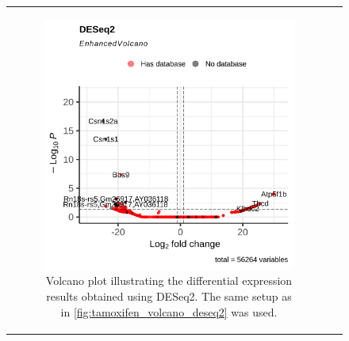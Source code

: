 \begin{figure}[H] \begin{tabular}{cc} \begin{subfigure}{0.5\textwidth}
                 \centering

                 \includegraphics[width=\linewidth]{chapters/4_results_and_discussion/figures/dea/deseq2/letrozole/volcano.png}
                 \caption{Volcano plot illustrating the differential expression
                     results obtained
                     using DESeq2.
                     The same setup as in \cref{fig:tamoxifen_volcano_deseq2} was used.
                 }
                 \label{fig:letrozole_volcano_deseq2}
             \end{subfigure}
        \begin{subfigure}{0.5\textwidth}
            \centering


\end{subfigure}
\end{tabular}
\end{figure}
